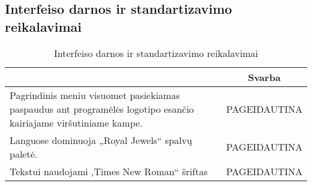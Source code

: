 \documentclass{VUMIFPSkursinis}
\begin{document}
\subsection{Interfeiso darnos ir standartizavimo reikalavimai}
\begin{center}
	\begin{table}[H]
	\begin{tabular}{|p{16cm}|p{2cm}|}
	\hline
	    \rowcolor{lightgray}
		\multicolumn{1}{|c|}{ {\bfseries Užduotis}}&
		\multicolumn{1}{|c|}{{\bfseries Svarba}}\\		
	\hline
		\multicolumn{1}{|p{14,5cm}|}{Pagrindinis meniu visuomet pasiekiamas paspaudus ant programėlės logotipo esančio kairiajame viršutiniame kampe.}& 
		\multicolumn{1}{|p{1.5cm}|}{PAGEIDAUTINA}\\
	\hline
		\multicolumn{1}{|p{14,5cm}|}{Languose dominuoja „Royal Jewels“ spalvų paletė.}& 
		\multicolumn{1}{|p{1.5cm}|}{PAGEIDAUTINA}\\
	\hline
		\multicolumn{1}{|p{14,5cm}|}{Tekstui naudojami ‚Times New Roman“ šriftas}& 
		\multicolumn{1}{|p{1.5cm}|}{PAGEIDAUTINA}\\
	\hline  	 	
	
	\end{tabular}
	\caption{Interfeiso darnos ir standartizavimo reikalavimai}
	\label{table:4}
	\end{table}

\end{center}
\end{document}
